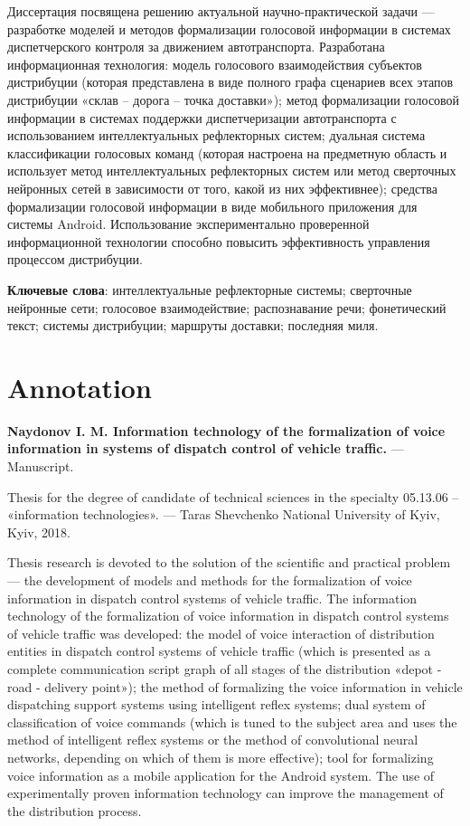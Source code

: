 Диссертация посвящена решению актуальной научно-практической задачи --- разработке моделей и методов формализации голосовой информации в системах диспетчерского контроля за движением автотранспорта. Разработана информационная технология: модель голосового взаимодействия субъектов дистрибуции (которая представлена в виде полного графа сценариев всех этапов дистрибуции «склав -- дорога -- точка доставки»); метод формализации голосовой информации в системах поддержки диспетчеризации автотранспорта с использованием интеллектуальных рефлекторных систем; дуальная система классификации голосовых команд (которая настроена на предметную область и использует метод интеллектуальных рефлекторных систем или метод сверточных нейронных сетей в зависимости от того, какой из них эффективнее); средства формализации голосовой информации в виде мобильного приложения для системы Android. Использование экспериментально проверенной информационной технологии способно повысить эффективность управления процессом дистрибуции.

\textbf{Ключевые слова}: интеллектуальные рефлекторные системы; сверточные нейронные
сети; голосовое взаимодействие; распознавание речи; фонетический текст; системы дистрибуции; маршруты доставки; последняя миля.

\section*{Annotation}

\textbf{Naydonov I. M. Information technology of the formalization of voice information in systems of dispatch control of vehicle traffic.} --- Manuscript.

Thesis for the degree of candidate of technical sciences in the specialty 05.13.06 -- «information technologies». --- Taras Shevchenko National University of Kyiv, Kyiv, 2018.

Thesis research is devoted to the solution of the scientific and practical problem --- the development of models and methods for the formalization of voice information in dispatch control systems of vehicle traffic. The information technology of the formalization of voice information in dispatch control systems of vehicle traffic was developed: the model of voice interaction of distribution entities in dispatch control systems of vehicle traffic (which is presented as a complete communication script graph of all stages of the distribution «depot - road - delivery point»); the method of formalizing the voice information in vehicle dispatching support systems using intelligent reflex systems; dual system of classification of voice commands (which is tuned to the subject area and uses the method of intelligent reflex systems or the method of convolutional neural networks, depending on which of them is more effective); tool for formalizing voice information as a mobile application for the Android system. The use of experimentally proven information technology can improve the management of the distribution process.

